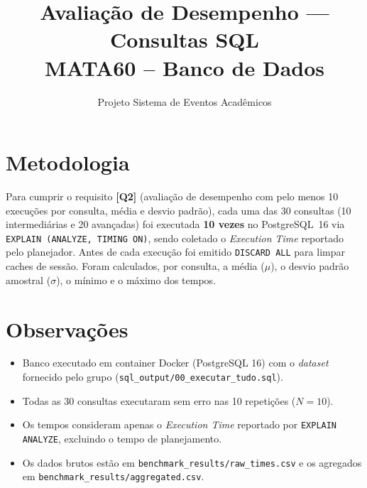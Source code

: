 \documentclass[12pt,a4paper]{article}
\title{Avalia\c{c}\~ao de Desempenho --- Consultas SQL\\\large MATA60 -- Banco de Dados}
\author{Projeto Sistema de Eventos Acad\^emicos}
\date{}
\begin{document}
\maketitle

\section*{Metodologia}

Para cumprir o requisito \textbf{[Q2]} (avalia\c{c}\~ao de desempenho com pelo menos
10 execu\c{c}\~oes por consulta, m\'edia e desvio padr\~ao), cada uma das
30 consultas (10 intermedi\'arias e 20 avan\c{c}adas) foi executada
\textbf{10 vezes} no PostgreSQL~16 via \texttt{EXPLAIN (ANALYZE, TIMING ON)},
sendo coletado o \emph{Execution Time} reportado pelo planejador.
Antes de cada execu\c{c}\~ao foi emitido \texttt{DISCARD ALL} para limpar
caches de sess\~ao. Foram calculados, por consulta, a m\'edia ($\mu$),
o desvio padr\~ao amostral ($\sigma$), o m\'inimo e o m\'aximo dos tempos.



\section*{Observa\c{c}\~oes}

\begin{itemize}
  \item Banco executado em container Docker (PostgreSQL 16) com o
        \emph{dataset} fornecido pelo grupo (\texttt{sql\_output/00\_executar\_tudo.sql}).
  \item Todas as 30 consultas executaram sem erro nas 10 repeti\c{c}\~oes ($N=10$).
  \item Os tempos consideram apenas o \emph{Execution Time} reportado por
        \texttt{EXPLAIN ANALYZE}, excluindo o tempo de planejamento.
  \item Os dados brutos est\~ao em \texttt{benchmark\_results/raw\_times.csv}
        e os agregados em \texttt{benchmark\_results/aggregated.csv}.
\end{itemize}
\end{document}
